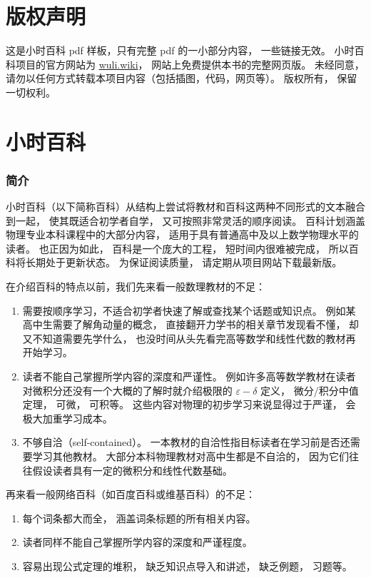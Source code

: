 
\chapter*{版权声明}

这是小时百科 pdf 样板，只有完整 pdf 的一小部分内容， 一些链接无效。 小时百科项目的官方网站为 \href{https://wuli.wiki}{wuli.wiki}， 网站上免费提供本书的完整网页版。 未经同意， 请勿以任何方式转载本项目内容（包括插图，代码，网页等）。 版权所有， 保留一切权利。

\chapter*{小时百科}

\subsection{简介}

小时百科（以下简称百科）从结构上尝试将教材和百科这两种不同形式的文本融合到一起， 使其既适合初学者自学， 又可按照非常灵活的顺序阅读。 百科计划涵盖物理专业本科课程中的大部分内容， 适用于具有普通高中及以上数学物理水平的读者。 也正因为如此， 百科是一个庞大的工程， 短时间内很难被完成， 所以百科将长期处于更新状态。 为保证阅读质量， 请定期从项目网站下载最新版。

在介绍百科的特点以前，我们先来看一般数理教材的不足：
\begin{enumerate}
\item 需要按顺序学习，不适合初学者快速了解或查找某个话题或知识点。 例如某高中生需要了解角动量的概念， 直接翻开力学书的相关章节发现看不懂， 却又不知道需要先学什么， 也没时间从头先看完高等数学和线性代数的教材再开始学习。
\item 读者不能自己掌握所学内容的深度和严谨性。 例如许多高等数学教材在读者对微积分还没有一个大概的了解时就介绍极限的 $\varepsilon-\delta$ 定义， 微分/积分中值定理， 可微， 可积等。 这些内容对物理的初步学习来说显得过于严谨， 会极大加重学习成本。
\item 不够自洽（self-contained）。 一本教材的自洽性指目标读者在学习前是否还需要学习其他教材。 大部分本科物理教材对高中生都是不自洽的， 因为它们往往假设读者具有一定的微积分和线性代数基础。
\end{enumerate}

再来看一般网络百科（如百度百科或维基百科）的不足：
\begin{enumerate}
\item 每个词条都大而全， 涵盖词条标题的所有相关内容。
\item 读者同样不能自己掌握所学内容的深度和严谨程度。
\item 容易出现公式定理的堆积， 缺乏知识点导入和讲述， 缺乏例题， 习题等。
\end{enumerate}

